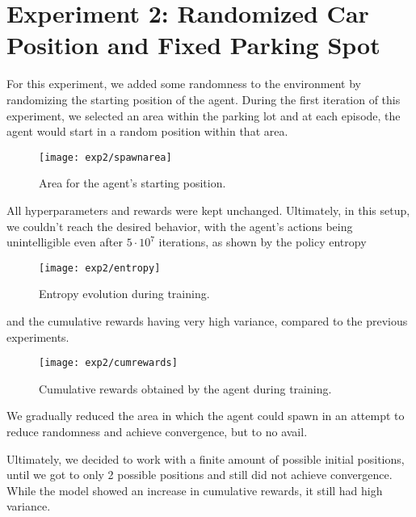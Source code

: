 \section{Experiment 2: Randomized Car Position and Fixed Parking Spot}
For this experiment, we added some randomness to the environment by randomizing the starting position of the agent. During the first iteration of this experiment, we selected an area within the parking lot and at each episode, the agent would start in a random position within that area. 
\begin{figure}[H]
    \texttt{[image: exp2/spawnarea]}
    \caption{Area for the agent's starting position.}
    \label{fig:randomspawnarea}
\end{figure}
All hyperparameters and rewards were kept unchanged. Ultimately, in this setup, we couldn't reach the desired behavior, with the agent's actions being unintelligible even after $5\cdot 10^{7}$ iterations, as shown by the policy entropy
\begin{figure}[H]
    \texttt{[image: exp2/entropy]}
    \caption{Entropy evolution during training.}
    \label{fig:entropy2}
\end{figure}
and the cumulative rewards having very high variance, compared to the previous experiments.
\begin{figure}[H]
    \texttt{[image: exp2/cumrewards]}
    \caption{Cumulative rewards obtained by the agent during training.}
    \label{fig:cumrewards2}
\end{figure}
We gradually reduced the area in which the agent could spawn in an attempt to reduce randomness and achieve convergence, but to no avail.

Ultimately, we decided to work with a finite amount of possible initial positions, until we got to only 2 possible positions and still did not achieve convergence. While the model showed an increase in cumulative rewards, it still had high variance.